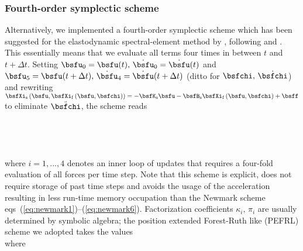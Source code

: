 \subsubsection{Fourth-order symplectic scheme} \label{section:symplectic}
%
Alternatively, we implemented a fourth-order symplectic
scheme which has been suggested for the elastodynamic
spectral-element method by \citet{Ampuero+:07}, following
\citet[][eq.~(22)]{omelyan+:02} and \citet{omelyan+:03}.
This essentially means that we evaluate all terms four
times in between $t$ and $t+\Delta{t}$.
Setting $\bsfu_0=\bsfu(t),\,\dot{\bsfu}_0=\dot{\bsfu}(t)$ and
$\bsfu_5=\bsfu(t+\Delta t),\,\dot{\bsfu}_4=\dot{\bsfu}(t+ \Delta t)$
(ditto for $\bsfchi,\,\dot{\bsfchi}$) and rewriting
$\bsfXi_{\rm s}\left(\bsfu,\bsfXi_{\rm f}\left(\bsfu,\bsfchi\right)\right)=
-\bsfK_{\rm s}\bsfu-\bsfB_{\rm s}
\bsfXi_{\rm f}\left(\bsfu,\bsfchi\right)
+\bsff$ to eliminate $\ddot{\bsfchi}$, the scheme reads
%
\eqa \label{eq:pefrl}
\\
\\
\\
\\
\\
\ena
%
where $i=1,...,4$ denotes an inner loop of updates that requires a four-fold
evaluation of all forces per time step. Note that this scheme is explicit,
does not require storage of past time steps and avoids the usage of the
acceleration resulting in less run-time memory occupation than the Newmark
scheme eqs~(\ref{eq:newmark1})--(\ref{eq:newmark6}).
Factorization coefficients $\kappa_i,\,\pi_i$ are usually determined
by symbolic algebra; the position extended Forest-Ruth like
(PEFRL) scheme we adopted takes the values
%
\eqa
{}\\
\ena
%
where
\eqa
{}\\
\\
